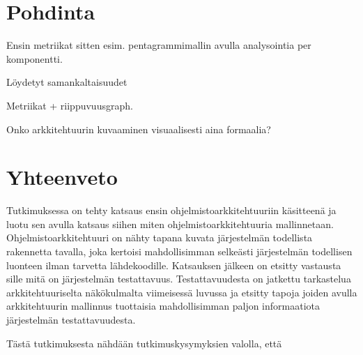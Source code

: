\documentclass[finnish]{tktltiki2}
\numberwithin{table}{section}
\theoremstyle{definition}
\theoremstyle{remark}
\begin{document}
\newpage

\section{Pohdinta} \label{pondering}

Ensin metriikat sitten esim. pentagrammimallin avulla analysointia per komponentti.

Löydetyt samankaltaisuudet

Metriikat + riippuvuusgraph.

Onko arkkitehtuurin kuvaaminen visuaalisesti aina formaalia?


\newpage

\section{Yhteenveto}

Tutkimuksessa on tehty katsaus ensin ohjelmistoarkkitehtuuriin käsitteenä ja luotu sen avulla katsaus siihen miten ohjelmistoarkkitehtuuria mallinnetaan. Ohjelmistoarkkitehtuuri on nähty tapana kuvata järjestelmän todellista rakennetta tavalla, joka kertoisi mahdollisimman selkeästi järjestelmän todellisen luonteen ilman tarvetta lähdekoodille. Katsauksen jälkeen on etsitty vastausta sille mitä on järjestelmän testattavuus. Testattavuudesta on jatkettu tarkastelua arkkitehtuuriselta näkökulmalta viimeisessä luvussa ja etsitty tapoja joiden avulla arkkitehtuurin mallinnus tuottaisia mahdollisimman paljon informaatiota järjestelmän testattavuudesta.

Tästä tutkimuksesta nähdään tutkimuskysymyksien valolla, että

\newpage



%
%
% 
%

%






% 
\end{document}
